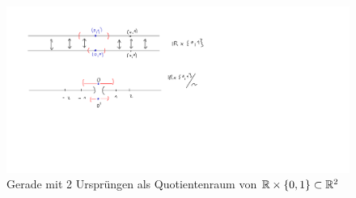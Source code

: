 \begin{remark*}
\begin{enumerate}[i)]
    \end{enumerate}
    \begin{figure}[H]
        \includegraphics[scale=0.4]{figures/line-with-2-origins.pdf}
    \caption{Gerade mit 2 Ursprüngen als Quotientenraum von $\mathbb{R}\times \left \{0,1\right\} \subset \mathbb{R}^2$}
    \end{figure}
\end{remark*}

